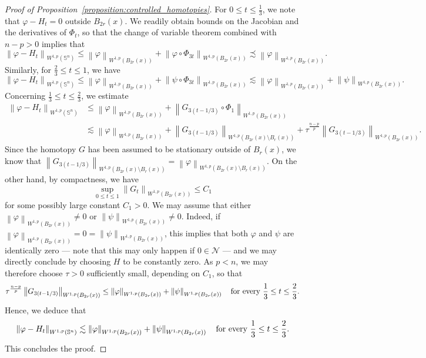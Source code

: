 \documentclass[10pt,a4paper]{amsart}
\def\S{{\mathbb S}}
\newcommand{\aleq}{\precsim}
\newcommand{\brac}[1]{\left (#1 \right )}
\def\n{{\mathcal N}}
\newcommand{\norm}[1]{\left\|{#1}\right\|}
\begin{document}
\begin{proof}[Proof of Proposition~\ref{proposition:controlled_homotopies}]
	For $ 0 \leq t \leq \frac{1}{3} $, we note that $\varphi - H_t =0$ outside $B_{2r}(x)$. We readily obtain bounds on the Jacobian and the derivatives of $ \Phi_{t} $, so that the change of variable theorem combined with $n-p>0$ implies that
	\[
			\norm{\varphi - H_{t}}_{W^{1,p}(\S^n)}
		\leq
		\norm{\varphi}_{W^{1,p}(B_{2r}(x))} + \norm{\varphi \circ \Phi_{3t}}_{W^{1,p}(B_{2r}(x))}
		\aleq \norm{\varphi}_{W^{1,p}(B_{2r}(x))}\text{.}
	\]
	Similarly, for $ \frac{2}{3} \leq t \leq 1 $, we have
	\[
		\norm{\varphi - H_{t}}_{W^{1,p}(\S^n)}
		\leq
		\norm{\varphi}_{W^{1,p}(B_{2r}(x))} + \norm{\psi \circ \Phi_{3t}}_{W^{1,p}(B_{2r}(x))}
		\lesssim
		\norm{\varphi}_{W^{1,p}(B_{2r}(x))} + \norm{\psi}_{W^{1,p}(B_{2r}(x))}\text{.}
	\]
	Concerning $ \frac{1}{3} \leq t \leq \frac{2}{3} $, we estimate
	\[
	\begin{split}
		\norm{\varphi - H_{t}}_{W^{1,p}(\S^n)}
		&\leq
 		\norm{\varphi}_{W^{1,p}(B_{2r}(x))} + \norm{G_{3\brac{t-1/3}} \circ \Phi_{1}}_{W^{1,p}(B_{2r}(x))}\\
 		&\lesssim
  		\norm{\varphi}_{W^{1,p}(B_{2r}(x))} + \norm{G_{3\brac{t-1/3}}}_{W^{1,p}(B_{2r}(x) \setminus B_r(x)) } + \tau^{\frac{n-p}{p}}\norm{G_{3\brac{t-1/3}}}_{W^{1,p}(B_{2r}(x))}\text{.}
	\end{split}
	\]
	Since the homotopy $ G $ has been assumed to be stationary outside of $ B_r(x)  $, we know that $ \norm{G_{3\brac{t-1/3}}}_{W^{1,p}(B_{2r}(x) \setminus B_r(x))} = \norm{\varphi}_{W^{1,p}(B_{2r}(x)\setminus B_r(x) )} $.
	On the other hand, by compactness, we have
	\[
		\sup_{0 \leq t \leq 1} \norm{G_{t}}_{W^{1,p}(B_{2r}(x))}
		\leq
		C_1
	\]
	for some possibly large constant $ C_1 > 0 $.
	We may assume that either \( \norm{\varphi}_{W^{1,p}(B_{2r}(x))} \neq 0 \) or \( \norm{\psi}_{W^{1,p}(B_{2r}(x))} \neq 0 \).
	Indeed, if \( \norm{\varphi}_{W^{1,p}(B_{2r}(x))} = 0 = \norm{\psi}_{W^{1,p}(B_{2r}(x))} \), this implies that both \( \varphi \) and \( \psi \) are identically zero --- note that this may only happen if \( 0 \in \n \) --- and we may directly conclude by choosing \( H \) to be constantly zero.
	As $ p < n $, we may therefore choose $ \tau > 0 $ sufficiently small, depending on $ C_1 $, so that
	\[
		\tau^{\frac{n-p}{p}}\norm{G_{3\brac{t-1/3}}}_{W^{1,p}(B_{2r}(x))}
		\leq
		\norm{\varphi}_{W^{1,p}(B_{2r}(x))} + \norm{\psi}_{W^{1,p}(B_{2r}(x))}
		\quad
		\text{for every $ \frac{1}{3} \leq t \leq \frac{2}{3} $.}
	\]
	Hence, we deduce that
	\[
		\norm{\varphi - H_{t}}_{W^{1,p}(\S^n)}
		\lesssim
		\norm{\varphi}_{W^{1,p}(B_{2r}(x))} + \norm{\psi}_{W^{1,p}(B_{2r}(x))}
		\quad
		\text{for every $ \frac{1}{3} \leq t \leq \frac{2}{3} $.}
	\]
	This concludes the proof.
\end{proof}
\end{document}
